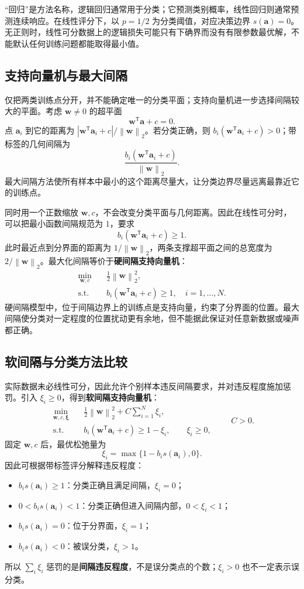 \documentclass[UTF8,fontset=fandol,a4paper,12pt]{ctexart}
\newcommand{\va}{\boldsymbol a}
\newcommand{\vw}{\boldsymbol w}
\newcommand{\norm}[1]{\left\lVert#1\right\rVert}
\theoremstyle{definition}
\begin{document}
“回归”是方法名称，逻辑回归通常用于分类；它预测类别概率，线性回归则通常预测连续响应。在线性评分下，以 $p=1/2$ 为分类阈值，对应决策边界 $s(\va)=0$。无正则时，线性可分数据上的逻辑损失可能只有下确界而没有有限参数最优解，不能默认任何训练问题都能取得最小值。

\subsection{支持向量机与最大间隔}
仅把两类训练点分开，并不能确定唯一的分类平面；支持向量机进一步选择间隔较大的平面。考虑 $\vw\ne0$ 的超平面
\[
 \vw^{\mathsf T}\va+c=0.
\]
点 $\va_i$ 到它的距离为 $|\vw^{\mathsf T}\va_i+c|/\norm{\vw}_2$。若分类正确，则 $b_i(\vw^{\mathsf T}\va_i+c)>0$；带标签的几何间隔为
\[
 \frac{b_i(\vw^{\mathsf T}\va_i+c)}{\norm{\vw}_2}.
\]
最大间隔方法使所有样本中最小的这个距离尽量大，让分类边界尽量远离最靠近它的训练点。

同时用一个正数缩放 $\vw,c$，不会改变分类平面与几何距离。因此在线性可分时，可以把最小函数间隔规范为 $1$，要求
\[
 b_i(\vw^{\mathsf T}\va_i+c)\ge1.
\]
此时最近点到分界面的距离为 $1/\norm{\vw}_2$，两条支撑超平面之间的总宽度为 $2/\norm{\vw}_2$。最大化间隔等价于\textbf{硬间隔支持向量机}：
\[
 \boxed{\begin{aligned}
 \min_{\vw,c}\quad&\frac12\norm{\vw}_2^2,\\
 \text{s.t.}\quad&b_i(\vw^{\mathsf T}\va_i+c)\ge1,
 \quad i=1,\ldots,N.
 \end{aligned}}
\]
硬间隔模型中，位于间隔边界上的训练点是支持向量，约束了分界面的位置。最大间隔使分类对一定程度的位置扰动更有余地，但不能据此保证对任意新数据或噪声都正确。

\subsection{软间隔与分类方法比较}
实际数据未必线性可分，因此允许个别样本违反间隔要求，并对违反程度施加惩罚。引入 $\xi_i\ge0$，得到\textbf{软间隔支持向量机}：
\[
 \boxed{\begin{aligned}
 \min_{\vw,c,\boldsymbol\xi}\quad&\frac12\norm{\vw}_2^2+C\sum_{i=1}^N\xi_i,\\
 \text{s.t.}\quad&b_i(\vw^{\mathsf T}\va_i+c)\ge1-\xi_i,\qquad\xi_i\ge0,
 \end{aligned}}
 \qquad C>0.
\]
固定 $\vw,c$ 后，最优松弛量为
\[
 \xi_i=\max\{1-b_i s(\va_i),0\}.
\]
因此可根据带标签评分解释违反程度：
\begin{itemize}
\item $b_i s(\va_i)\ge1$：分类正确且满足间隔，$\xi_i=0$；
\item $0<b_i s(\va_i)<1$：分类正确但进入间隔内部，$0<\xi_i<1$；
\item $b_i s(\va_i)=0$：位于分界面，$\xi_i=1$；
\item $b_i s(\va_i)<0$：被误分类，$\xi_i>1$。
\end{itemize}
所以 $\sum_i\xi_i$ 惩罚的是\textbf{间隔违反程度}，不是误分类点的个数；$\xi_i>0$ 也不一定表示误分类。
\end{document}
